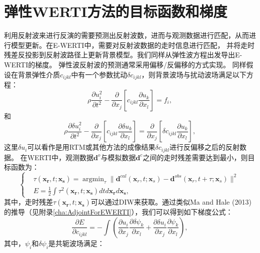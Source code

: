 \section{弹性WERTI方法的目标函数和梯度}
利用反射波来进行反演的需要预测出反射波数，进而与观测数据进行匹配，从而进行模型更新。在E-WERTI中，需要对反射波数据的走时信息进行匹配，
并将走时残差反投影到反射波路径上更新背景模型。我们同样从弹性波方程出发导出E-WERTI的梯度。
弹性波反射波的预测通常采用偏移/反偏移的方式实现。
同样假设在背景弹性介质$c_{ijkl}$中有一个参数扰动$\delta c_{ijkl}$，则背景波场与扰动波场满足以下方程：
\begin{equation}
    \rho \frac{\partial u^2_i}{\partial t^2}  -
    \frac{\partial}{\partial x_j}\left[ 
        c_{ijkl}\frac{\partial u_{k}}{\partial
        x_l}\right]=f_i,
    \label{eq:WE} 
\end{equation}
和
\begin{equation}
    \rho \frac{\partial \delta u^2_i}{\partial t^2}  -
    \frac{\partial}{\partial x_j}\left[ 
        c_{ijkl}\frac{\partial \delta u_{k}}{\partial
        x_l}\right]=\frac{\partial}{\partial x_j}\left[\delta c_{ijkl}\frac{\partial u_{k}}{\partial x_l}\right],
    \label{eq:DeltaWE} 
\end{equation}
这里$\delta u_i$可以看作是用RTM或其他方法的成像结果$\delta c_{ijkl}$进行反偏移之后的反射数据。
在WERTI中，观测数据$\mathbf{d}^{o}$与模拟数据$\mathbf{d}^{c}$之间的走时残差需要达到最小，则目标函数为：
\begin{equation}
	\left\{
		\begin{aligned}
			&\tau(\mathbf{x_r},t;\mathbf{x_s})=\mathop{\arg\min}_{\tau}
			\parallel\mathbf{d}^{cal}(\mathbf{x}_r,t;\mathbf{x}_s)-\mathbf{d}^{obs}(\mathbf{x}_r,t+\tau;\mathbf{x}_s)\parallel^2\\
    &E=\frac{1}{2}\int\tau^2(\mathbf{x_r},t;\mathbf{x_s})dtd\mathbf{x_r}d\mathbf{x_s},
		\end{aligned}
	\right.
    \label{eq:Objectivefunction} 
\end{equation}
其中，走时残差$\tau(\mathbf{x_r},t;\mathbf{x_s})$可以通过DIW来获取。通过类似Ma and
Hale (2013)\cite{ma2013}的推导（见附录\ref{cha:AdjointForEWERTI}），我们可以得到如下梯度公式：
\begin{equation}
    \frac{\partial E}{\partial c_{ijkl}}=-\int (\frac{\partial u_{i}}{\partial
    x_j}\frac{\partial \delta \psi_{k}}{\partial x_l}+\frac{\partial \delta u_{i}}{\partial
    x_j}\frac{\partial \psi_{k}}{\partial x_l}),
    \label{eq:GradientCijkl}
\end{equation}
其中，$\psi_i$和$\delta \psi_i$是共轭波场满足：
